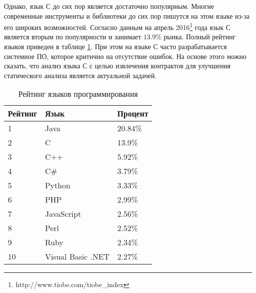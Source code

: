 Однако, язык С до сих пор является достаточно популярным. Многие современные инструменты и библиотеки до сих пор пишутся на этом языке из-за его широких возможностей. Согласно данным на апрель 2016\footnote{http://www.tiobe.com/tiobe\_index} года язык С является вторым по популярности и занимает $13.9\%$ рынка. Полный рейтинг языков приведен в таблице \ref{table:languages}. При этом на языке С часто разрабатывается системное ПО, которое критично на отсутствие ошибок. На основе этого можно сказать, что анализ языка С с целью извлечения контрактов для улучшения статического анализа является актуальной задачей.

\begin{table}
	\caption{Рейтинг языков программирования}
	\begin{center}
	\begin{tabular}{|l|l|l|}
	\hline 
	\textbf{Рейтинг} & \textbf{Язык} & \textbf{Процент}	\\ 
	\hline 
	1 & Java & 20.84\% \\ 
	\hline 
	2 & C & 13.9\% \\ 
	\hline 
	3 & C++ & 5.92\% \\ 
	\hline 
	4 & C\# & 3.79\% \\ 
	\hline 
	5 & Python & 3.33\% \\ 
	\hline 
	6 & PHP & 2.99\% \\ 
	\hline 
	7 & JavaScript & 2.56\% \\ 
	\hline 
	8 & Perl & 2.52\% \\ 
	\hline 
	9 & Ruby & 2.34\% \\ 
	\hline 
	10 & Visual Basic .NET & 2.27\% \\ 
	\hline 
	\end{tabular} 
	\end{center}
	\label{table:languages}
\end{table}

